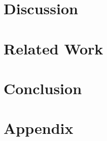 \documentclass[thesis]{plai}
\begin{document}
\chapter{Discussion}
\label{chapter:discussion}

\chapter{Related Work}
\label{chapter:related-work}


\chapter{Conclusion}
\label{chapter:conclusion}







\chapter*{Appendix}
\label{chapter:appendix}




\listoffigures{}
\listoftables{}
\lstlistoflistings
\listofalgorithms
{}

\printglossaries
\end{document}
